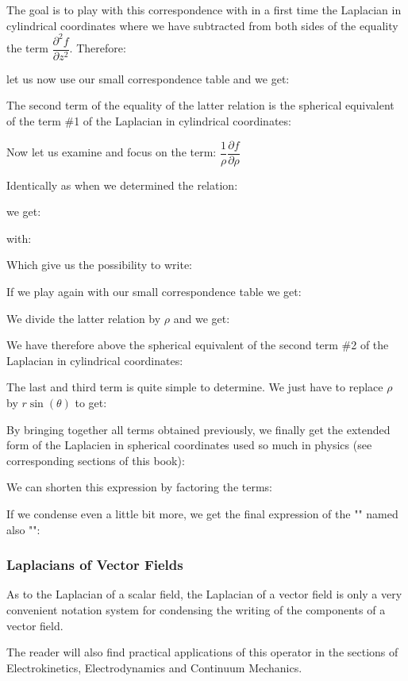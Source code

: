 	The goal is to play with this correspondence with in a first time the Laplacian in cylindrical coordinates where we have subtracted from both sides of the equality the term $\dfrac{\partial^2 f}{\partial z^2}$. Therefore:
	
	let us now use our small correspondence table and we get:
	
	The second term of the equality of the latter relation is the spherical equivalent of the term \#1 of the Laplacian in cylindrical coordinates:
	
	Now let us examine and focus on the term: $\dfrac{1}{\rho}\dfrac{\partial f}{\partial \rho}$
	
	Identically as when we determined the relation:
	
	we get:
	
	with:
	
	Which give us the possibility to write:
	
	If we play again with our small correspondence table we get:
	
	We divide the latter relation by $\rho$ and we get:
	
	We have therefore above the spherical equivalent of the second term \#2 of the Laplacian in cylindrical coordinates:
	
	The last and third term is quite simple to determine. We just have to replace $\rho$ by $r\sin(\theta)$ to get:
	
	By bringing together all terms obtained previously, we finally get the extended form of the Laplacien in spherical coordinates used so much in physics (see corresponding sections of this book):
	
	We can shorten this expression by factoring the terms:
	
	If we condense even a little bit more, we get the final expression of the "\label{scalar laplacian in spherical coordinates}" named also "":
	
	
	\subsubsection{Laplacians of Vector Fields}\label{laplacian of vector fields}
	As to the Laplacian of a scalar field, the Laplacian of a vector field is only a very convenient notation system for condensing the writing of the components of a vector field.
	
	The reader will also find practical applications of this operator in the sections of Electrokinetics, Electrodynamics and Continuum Mechanics.
	
